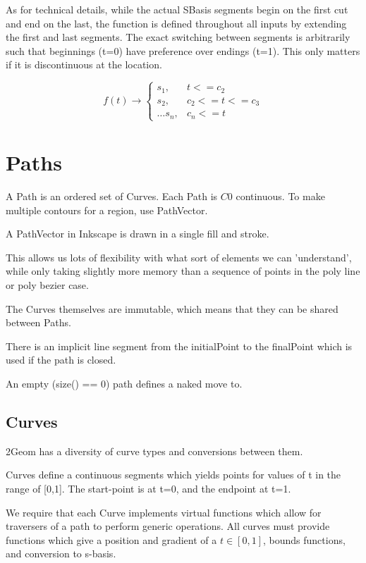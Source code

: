 \documentclass[openany]{book}
\newcommand{\code}[1]{\textsf{#1}}
\begin{document}
As for technical details, while the actual SBasis segments begin on the
first cut and end on the last, the function is defined throughout all
inputs by extending the first and last segments.  The exact switching
between segments is arbitrarily such that beginnings (t=0) have
preference over endings (t=1).  This only matters if it is discontinuous
at the location.

$$
f(t) \rightarrow \left\{ 
\begin{array}{cc}
s_1,& t <= c_2 \\
s_2,& c_2 <= t <= c_3\\
\ldots
s_n,& c_n <= t
\end{array}\right.
$$

\chapter{Paths}

A \code{Path} is an ordered set of \code{Curve}s.  Each \code{Path} is $C0$ continuous.  To make multiple contours for a region, use \code{PathVector}. 

A \code{PathVector} in Inkscape is drawn in a single fill and stroke.  

This allows us lots of flexibility with what sort of elements we can
'understand', while only taking slightly more memory than a sequence
of points in the poly line or poly bezier case. 

The Curves themselves are immutable, which means that they can be shared between Paths.

There is an implicit line segment from the initialPoint to the finalPoint which is used if the path is closed.

An empty (size() == 0) path defines a naked move to.

\section{Curves}
2Geom has a diversity of curve types and conversions between them.

Curves define a continuous segments which yields points for values of
t in the range of [0,1].  The start-point is at t=0, and the endpoint
at t=1.

We require that each \code{Curve} implements virtual functions which
allow for traversers of a path to perform generic operations.  All
curves must provide functions which give a position and gradient of a
$t \in [0,1]$, bounds functions, and conversion to s-basis.
\end{document}

